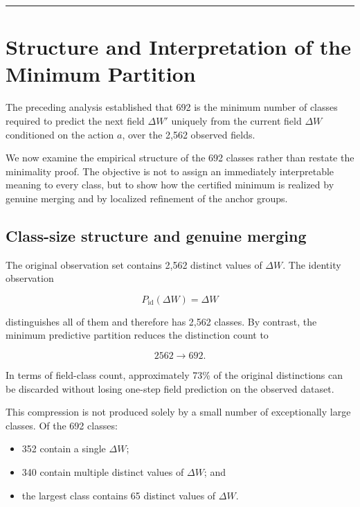 \documentclass[
  11pt,
]{article}
\providecommand{\tightlist}{%
  \setlength{\itemsep}{0pt}\setlength{\parskip}{0pt}}
\begin{document}
\begin{center}\rule{0.5\linewidth}{0.5pt}\end{center}

\hypertarget{structure-and-interpretation-of-the-minimum-partition}{%
\section{Structure and Interpretation of the Minimum
Partition}\label{structure-and-interpretation-of-the-minimum-partition}}

The preceding analysis established that 692 is the minimum number of
classes required to predict the next field \({\Delta W'}\) uniquely from
the current field \({\Delta W}\) conditioned on the action \({a}\), over
the 2,562 observed fields.

We now examine the empirical structure of the 692 classes rather than
restate the minimality proof. The objective is not to assign an
immediately interpretable meaning to every class, but to show how the
certified minimum is realized by genuine merging and by localized
refinement of the anchor groups.

\hypertarget{class-size-structure-and-genuine-merging}{%
\subsection{Class-size structure and genuine
merging}\label{class-size-structure-and-genuine-merging}}

The original observation set contains 2,562 distinct values of
\({\Delta W}\). The identity observation

\[{P_{\mathrm{id}}(\Delta W)=\Delta W}\]

distinguishes all of them and therefore has 2,562 classes. By contrast,
the minimum predictive partition reduces the distinction count to

\[{2562\longrightarrow692.}\]

In terms of field-class count, approximately 73\% of the original
distinctions can be discarded without losing one-step field prediction
on the observed dataset.

This compression is not produced solely by a small number of
exceptionally large classes. Of the 692 classes:

\begin{itemize}
\tightlist
\item
  352 contain a single \({\Delta W}\);
\item
  340 contain multiple distinct values of \({\Delta W}\); and
\item
  the largest class contains 65 distinct values of \({\Delta W}\).
\end{itemize}
\end{document}
